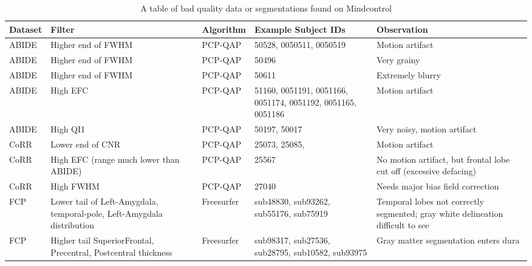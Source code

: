\begin{table}
\begin{tabular}{ | l | p{3cm} | l | p{3cm} | p{4cm} | }

\hline
	\textbf{Dataset} & \textbf{Filter} & \textbf{Algorithm} & \textbf{Example Subject IDs} & \textbf{Observation} \\ \hline
	ABIDE & Higher end of FWHM & PCP-QAP & 50528, 0050511, 0050519 & Motion artifact \\ \hline
	ABIDE & Higher end of FWHM & PCP-QAP & 50496 & Very grainy \\ \hline
	ABIDE & Higher end of FWHM & PCP-QAP & 50611 & Extremely blurry \\ \hline
	ABIDE & High EFC & PCP-QAP & 51160, 0051191, 0051166, 0051174, 0051192, 0051165, 0051186 & Motion artifact \\ \hline
	ABIDE & High QI1 & PCP-QAP & 50197, 50017 & Very noisy, motion artifact \\ \hline
	CoRR & Lower end of CNR & PCP-QAP & 25073, 25085, & Motion artifact \\ \hline
	CoRR & High EFC (range much lower than ABIDE) & PCP-QAP & 25567 & No motion artifact, but frontal lobe cut off (excessive defacing) \\ \hline
	CoRR & High FWHM & PCP-QAP & 27040 & Needs major bias field correction \\ \hline
	FCP & Lower tail of Left-Amygdala, temporal-pole, Left-Amygdala distribution & Freesurfer & sub48830, sub93262, sub55176, sub75919 & Temporal lobes not correctly segmented; gray white delineation difficult to see \\ \hline
	FCP & Higher tail SuperiorFrontal, Precentral, Postcentral thickness & Freesurfer & sub98317, sub27536, sub28795, sub10582, sub93975 & Gray matter segmentation enters dura \\ \hline



\end{tabular}
\label{tab:examples}
\caption{A table of bad quality data or segmentations found on Mindcontrol}

\end{table}

